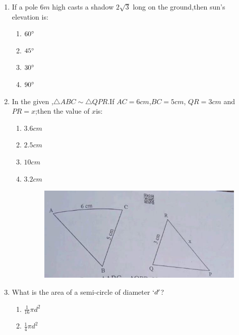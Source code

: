 %
\begin{enumerate}
    \item  If a pole $6 m$ high casts a shadow $2\sqrt{3}$  long on the ground,then sun's elevation is:
    \begin{enumerate}[label=(\alph*)]
        \item  $60\degree$
        \item  $45\degree$
        \item  $30\degree$
        \item  $90\degree$
    \end{enumerate}
    \item  In the given ,$\triangle ABC \sim  \triangle QPR$.If $AC= 6 cm$,$BC = 5 cm$, $QR = 3 cm$ and $PR=x$;then the value of $x$is:
        \begin{enumerate}[label=(\alph*)]
            \item  $3.6 cm$
            \item  $2.5 cm$
            \item  $10 cm$
            \item  $3.2 cm$
               \begin{figure}[H]
  \centering
  \includegraphics[width=\columnwidth]{figs/triangles.jpeg}
  \caption{}
  \label{fig:figures2}
\end{figure}
        \end{enumerate}
        \pagebreak
    \item  What is the area of a semi-circle of diameter $\lq d \rq$?
    \begin{enumerate}[label=(\alph*)]
        \item  $\frac{1}{16}\pi d^2$
        \item  $\frac{1}{4} \pi d^2$

\end{enumerate}
\end{enumerate}
